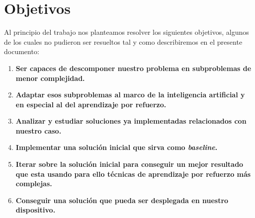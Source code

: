 
\cleardoublepage

\chapter{Objetivos}
\label{objetivos}

Al principio del trabajo nos planteamos resolver los siguientes objetivos, algunos de los cuales no pudieron ser resueltos tal y como describiremos en el presente documento:
\medskip
\begin{enumerate}[label=\destacado{\arabic*.}]
  \setlength\itemsep{1em}
  \item \textbf{Ser capaces de descomponer nuestro problema en subproblemas de menor complejidad.}
  \item \textbf{Adaptar esos subproblemas al marco de la inteligencia artificial y en especial al del aprendizaje por refuerzo.}
  \item \textbf{Analizar y estudiar soluciones ya implementadas relacionados con nuestro caso.}
  \item \textbf{Implementar una solución inicial que sirva como \textit{baseline}.}
  \item \textbf{Iterar sobre la solución inicial para conseguir un mejor resultado que esta usando para ello técnicas de aprendizaje por refuerzo más complejas.}
  \item \textbf{Conseguir una solución que pueda ser desplegada en nuestro dispositivo.}
\end{enumerate}

